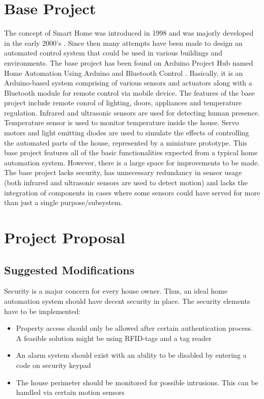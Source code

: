 \documentclass[journal]{IEEEtran}
\begin{document}
\section{Base Project}
The concept of Smart Home was introduced in 1998 and was majorly developed in the early 2000’s \textsuperscript{\cite{IEEEhowto:Hendricks}}. Since then many attempts have been made to design an automated control system that could be used in various buildings and environments. The base project has been found on Arduino Project Hub named Home Automation Using Arduino and Bluetooth Control \textsuperscript{\cite{IEEEhowto:Kumar}}. Basically, it is an Arduino-based system comprising of various sensors and actuators along with a Bluetooth module for remote control via mobile device. The features of the base project include remote conrol of lighting, doors, appliances and temperature regulation. Infrared and ultrasonic sensors are used for detecting human presence. Temperature sensor is used to monitor temperature inside the house. Servo motors and light emitting diodes are used to simulate the effects of controlling the automated parts of the house, represented by a miniature prototype.
This base project features all of the basic functionalities expected from a typical home automation system. However, there is a large space for improvements to be made. The base project lacks security, has unnecessary redundancy in sensor usage (both infrared and ultrasonic sensors are used to detect motion) and lacks the integration of components in cases where some sensors could have served for more than just a single purpose/subsystem.


\section{Project Proposal}

\subsection{Suggested Modifications}
Security is a major concern for every house owner. Thus, an ideal home automation system should have decent security in place. The security elements have to be implemented:
\begin{itemize}
    \item {Property access should only be allowed after certain authentication process. A feasible solution might be using RFID-tags and a tag reader}
    \item {An alarm system should exist with an ability to be disabled by entering a code on security keypad}
    \item {The house perimeter should be monitored for possible intrusions. This can be handled via certain motion sensors}
\end{itemize}
\end{document}
